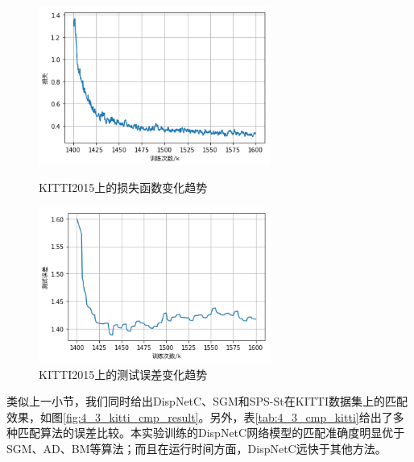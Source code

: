 \begin{figure}[htbp]
	\centering
	\begin{minipage}[c]{0.48\textwidth}
		\centering
		\includegraphics[width=3in]{figures/4_3_kitti_loss}
		\caption{KITTI2015上的损失函数变化趋势}\label{fig:4_3_kitti_loss}
	\end{minipage}
	\hfill
	\begin{minipage}[c]{0.48\textwidth}
		\centering
		\includegraphics[width=3in]{figures/4_3_kitti_test_error}
		\caption{KITTI2015上的测试误差变化趋势}\label{fig:4_3_test_error}
	\end{minipage}
\end{figure}

类似上一小节，我们同时给出DispNetC、SGM和SPS-St在KITTI数据集上的匹配效果，如图\ref{fig:4_3_kitti_cmp_result}。另外，表\ref{tab:4_3_cmp_kitti}给出了多种匹配算法的误差比较\cite{Menze_2015_CVPR}\cite{陈拓2017CCNN}。本实验训练的DispNetC网络模型的匹配准确度明显优于SGM、AD、BM等算法；而且在运行时间方面，DispNetC远快于其他方法。

